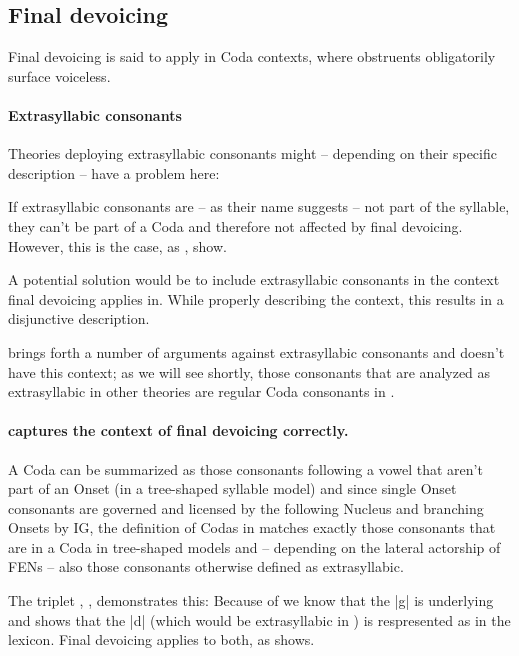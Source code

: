 \subsection{Final devoicing}

Final devoicing is said to apply in Coda contexts,
where obstruents obligatorily surface voiceless.

\paragraph{Extrasyllabic consonants}
Theories deploying extrasyllabic consonants might
-- depending on their specific description --
have a problem here:

If extrasyllabic consonants are -- as their name suggests --
not part of the syllable, they can't be part of a Coda
and therefore not affected by final devoicing.
However, this is the case,
as  \ti{[ma:kt]},  \ti{[ja:kt]} show.

A potential solution would be to include extrasyllabic
consonants in the context final devoicing applies in.
While properly describing the context, this results
in a disjunctive description.

\cite{scheer2004} brings forth a number of arguments
against extrasyllabic consonants and \CVCV doesn't
have this context; as we will see shortly, those
consonants that are analyzed as extrasyllabic in other
theories are regular Coda consonants in \CVCV.

\paragraph{\CVCV captures the context of final devoicing correctly.}
A Coda can be summarized as those consonants following
a vowel that aren't part of an Onset
(in a tree-shaped syllable model) and since single Onset
consonants are governed and licensed by the following
Nucleus and branching Onsets by \gls{IG},
the definition of Codas in \CVCV matches exactly those
consonants that are in a Coda in tree-shaped models
and -- depending on the lateral actorship of \glspl{FEN} --
also those consonants otherwise defined as extrasyllabic.

The triplet , , 
demonstrates this: Because of  we know
that the |g| is underlying and  shows
that the |d| (which would be extrasyllabic in )
is respresented as  in the lexicon.
Final devoicing applies to both, as \ti{[ja:kt]} shows.

